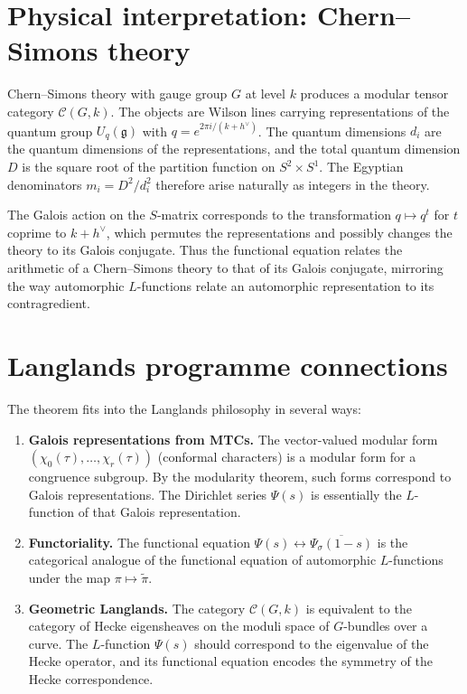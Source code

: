 \documentclass[12pt,a4paper]{article}
\theoremstyle{definition}
\theoremstyle{remark}
\begin{document}

\section{Physical interpretation: Chern--Simons theory}

Chern--Simons theory \cite{Witten} with gauge group $G$ at level $k$ produces a
modular tensor category $\mathcal{C}(G,k)$. The objects are Wilson lines carrying
representations of the quantum group $U_q(\mathfrak{g})$ with
$q=e^{2\pi i/(k+h^\vee)}$. The quantum dimensions $d_i$ are the quantum
dimensions of the representations, and the total quantum dimension $D$ is the
square root of the partition function on $S^2\times S^1$. The Egyptian
denominators $m_i = D^2/d_i^2$ therefore arise naturally as integers in the
theory.

The Galois action on the $S$-matrix corresponds to the transformation
$q\mapsto q^t$ for $t$ coprime to $k+h^\vee$, which permutes the representations
and possibly changes the theory to its Galois conjugate. Thus the functional
equation relates the arithmetic of a Chern--Simons theory to that of its Galois
conjugate, mirroring the way automorphic $L$-functions relate an automorphic
representation to its contragredient.


\section{Langlands programme connections}

The theorem fits into the Langlands philosophy in several ways:

\begin{enumerate}
  \item \textbf{Galois representations from MTCs.} The vector-valued modular form
    $(\chi_0(\tau),\dots,\chi_r(\tau))$ (conformal characters) is a modular form
    for a congruence subgroup. By the modularity theorem, such forms correspond to
    Galois representations. The Dirichlet series $\Psi(s)$ is essentially the
    $L$-function of that Galois representation.

  \item \textbf{Functoriality.} The functional equation
    $\Psi(s)\leftrightarrow\overline{\Psi_{\sigma}(1-s)}$ is the categorical
    analogue of the functional equation of automorphic $L$-functions under the map
    $\pi\mapsto\widetilde{\pi}$.

  \item \textbf{Geometric Langlands.} The category $\mathcal{C}(G,k)$ is
    equivalent to the category of Hecke eigensheaves on the moduli space of
    $G$-bundles over a curve. The $L$-function $\Psi(s)$ should correspond to the
    eigenvalue of the Hecke operator, and its functional equation encodes the
    symmetry of the Hecke correspondence.
\end{enumerate}
\end{document}
